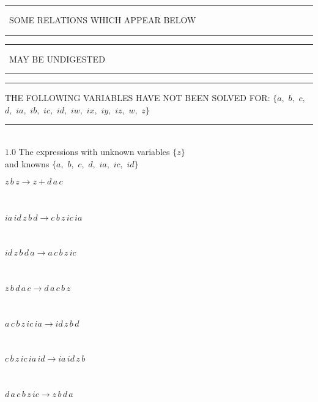 \documentclass[rep10,leqno]{report}
\begin{document}
\rule[2pt]{1.45in}{4pt}
\ SOME RELATIONS WHICH APPEAR BELOW\ 
\rule[2pt]{1.45in}{4pt}\hfil\break
\rule[2pt]{2.18in}{4pt}
\ MAY BE UNDIGESTED\ 
\rule[2pt]{2.18in}{4pt}\hfil\break
\rule[2pt]{6in}{4pt}\hfil\break
THE FOLLOWING VARIABLES HAVE NOT BEEN SOLVED FOR:\hfil\break
$\{a,
$ $
b,
$ $
c,
$ $
d,
$ $
ia,
$ $
ib,
$ $
ic,
$ $
id,
$ $
iw,
$ $
ix,
$ $
iy,
$ $
iz,
$ $
w,
$ $
z\}$
\smallskip\\
\rule[3pt]{6in}{.7pt}\\
$1.0$  The expressions with unknown variables $\{z\}$\\
and knowns $\{a,
$ $
b,
$ $
c,
$ $
d,
$ $
ia,
$ $
ic,
$ $
id\}$\smallskip\\
\begin{minipage}{6in}
$
z\,
 b\,
 z\rightarrow z + d\,
 a\,
 c
$
\end{minipage}\medskip \\
\begin{minipage}{6in}
$
ia\,
 id\,
 z\,
 b\,
 d\rightarrow c\,
 b\,
 z\,
 ic\,
 ia
$
\end{minipage}\medskip \\
\begin{minipage}{6in}
$
id\,
 z\,
 b\,
 d\,
 a\rightarrow a\,
 c\,
 b\,
 z\,
 ic
$
\end{minipage}\medskip \\
\begin{minipage}{6in}
$
z\,
 b\,
 d\,
 a\,
 c\rightarrow d\,
 a\,
 c\,
 b\,
 z
$
\end{minipage}\medskip \\
\begin{minipage}{6in}
$
a\,
 c\,
 b\,
 z\,
 ic\,
 ia\rightarrow id\,
 z\,
 b\,
 d
$
\end{minipage}\medskip \\
\begin{minipage}{6in}
$
c\,
 b\,
 z\,
 ic\,
 ia\,
 id\rightarrow ia\,
 id\,
 z\,
 b
$
\end{minipage}\medskip \\
\begin{minipage}{6in}
$
d\,
 a\,
 c\,
 b\,
 z\,
 ic\rightarrow z\,
 b\,
 d\,
 a
$
\end{minipage}\\
\vspace{10pt}
\end{document}
